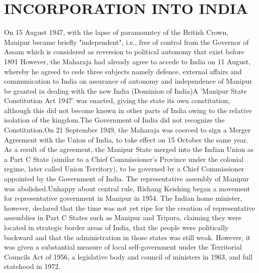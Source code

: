 \documentclass[10pt,a4 paper,two coloum] {article}
\begin{document}
\section{INCORPORATION INTO INDIA}
On 15 August 1947, with the lapse of paramountcy of the British Crown, Manipur became briefly "independent", i.e., free of control from the Governor of Assam which is considered as reversion to political autonomy that exist before 1891 However, the Maharaja had already agree to accede to India on 11 August, whereby he agreed to cede three subjects namely defence, external affairs and communication to India on assurance of autonomy and independence of Manipur be granted in dealing with the new India (Dominion of India)A 'Manipur State Constitution Act 1947' was enacted, giving the state its own constitution, although this did not become known in other parts of India owing to the relative isolation of the kingdom.The Government of India did not recognize the Constitution.On 21 September 1949, the Maharaja was coerced to sign a Merger Agreement with the Union of India, to take effect on 15 October the same year. As a result of the agreement, the Manipur State merged into the Indian Union as a Part C State (similar to a Chief Commissioner's Province under the colonial regime, later called Union Territory), to be governed by a Chief Commissioner appointed by the Government of India. The representative assembly of Manipur was abolished.Unhappy about central rule, Rishang Keishing began a movement for representative government in Manipur in 1954. The Indian home minister, however, declared that the time was not yet ripe for the creation of representative assemblies in Part C States such as Manipur and Tripura, claiming they were located in strategic border areas of India, that the people were politically backward and that the administration in those states was still weak. However, it was given a substantial measure of local self-government under the Territorial Councils Act of 1956, a legislative body and council of ministers in 1963, and full statehood in 1972.
\end{document}
